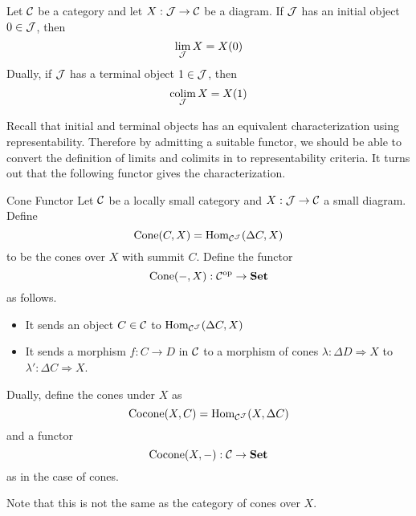 \documentclass[a4paper]{article}
\begin{document}
\begin{prp}{}{} Let $\mathcal{C}$ be a category and let $X:\mathcal{J}\to\mathcal{C}$ be a diagram. If $\mathcal{J}$ has an initial object $0\in\mathcal{J}$, then $$\lim_{\mathcal{J}} X=X(0)$$ Dually, if $\mathcal{J}$ has a terminal object $1\in\mathcal{J}$, then $$\operatorname*{colim}_{\mathcal{J}} X=X(1)$$
\end{prp}

Recall that initial and terminal objects has an equivalent characterization using representability. Therefore by admitting a suitable functor, we should be able to convert the definition of limits and colimits in to representability criteria. It turns out that the following functor gives the characterization. 

\begin{defn}{Cone Functor}{} Let $\mathcal{C}$ be a locally small category and $X:\mathcal{J}\to\mathcal{C}$ a small diagram. Define $$\text{Cone}(C,X)=\operatorname{Hom}_{\mathcal{C}^{\mathcal{J}}}(\Delta C,X)$$ to be the cones over $X$ with summit $C$. Define the functor $$\text{Cone}(-,X):\mathcal{C}^\text{op}\to\bold{Set}$$ as follows. 
\begin{itemize}
\item It sends an object $C\in\mathcal{C}$ to $\operatorname{Hom}_{\mathcal{C}^{\mathcal{J}}}(\Delta C,X)$
\item It sends a morphism $f:C\to D$ in $\mathcal{C}$ to a morphism of cones $\lambda:\Delta D\Rightarrow X$ to $\lambda':\Delta C\Rightarrow X$. 
\end{itemize}
Dually, define the cones under $X$ as $$\text{Cocone}(X,C)=\operatorname{Hom}_{\mathcal{C}^{\mathcal{J}}}(X,\Delta C)$$ and a functor $$\text{Cocone}(X,-):\mathcal{C}\to\bold{Set}$$ as in the case of cones. 
\end{defn}

Note that this is not the same as the category of cones over $X$. 
\end{document}

